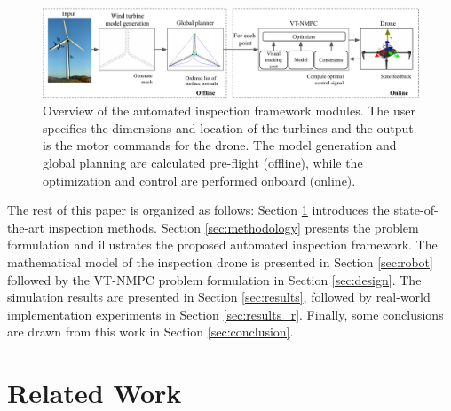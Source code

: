 \documentclass[letterpaper, 10 pt, conference]{ieeeconf}  %
\begin{document}
\begin{figure}
    \centering
    \includegraphics[width=1\textwidth]{Autonomous_Robots/figures/abstract_vtmpc_1.pdf}
    \caption{Overview of the automated inspection framework modules. The user specifies the dimensions and location of the turbines and the output is the motor commands for the drone. The model generation and global planning are calculated pre-flight (offline), while the optimization and control are performed onboard (online).} 
    \label{fig:abstract}
\end{figure}


The rest of this paper is organized as follows: Section \ref{sec:RelatedWork} introduces the state-of-the-art inspection methods. Section \ref{sec:methodology} presents the problem formulation and illustrates the proposed automated inspection framework. The mathematical model of the inspection drone is presented in Section \ref{sec:robot} followed by the \ac{VT-NMPC} problem formulation in Section \ref{sec:design}. The simulation results are presented in Section \ref{sec:results}, followed by real-world implementation experiments in Section \ref{sec:results_r}. Finally, some conclusions are drawn from this work in Section \ref{sec:conclusion}.


\section{Related Work}
\label{sec:RelatedWork}


\end{document}
